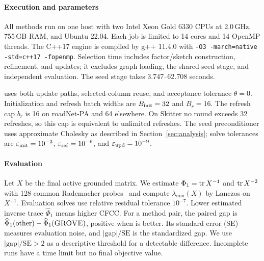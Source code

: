 \paragraph{Execution and parameters}
All methods run on one host with two Intel Xeon Gold 6330 CPUs at
2.0\,GHz, 755\,GB RAM, and Ubuntu 22.04. Each job is limited to
14 cores and 14 OpenMP threads. The C++17 engine is compiled by
g++ 11.4.0 with \texttt{-O3 -march=native -std=c++17 -fopenmp}.
Selection time includes factor/sketch construction, refinement, and
updates; it excludes graph loading, the shared seed stage, and
independent evaluation. The seed stage takes 3.747--62.708 seconds.

\alg{} uses both update paths, selected-column reuse, and acceptance tolerance $\theta=0$. Initialization and refresh
batch widths are $B_{\rm init}=32$ and $B_r=16$. The refresh cap $b_r$
is 16 on roadNet-PA and 64 elsewhere. On Skitter no round exceeds
32 refreshes, so this cap is equivalent to unlimited refreshes.
The seed preconditioner uses approximate Cholesky as described in
Section~\ref{sec:analysis}; solve tolerances are
$\varepsilon_{\rm init}=10^{-3}$, $\varepsilon_{\rm ref}=10^{-6}$, and $\varepsilon_{\rm upd}=10^{-9}$.

\paragraph{Evaluation}
Let $X$ be the final active grounded matrix. We estimate
$\Phi_1=\operatorname{tr} X^{-1}$ and $\operatorname{tr} X^{-2}$ with 128 common
Rademacher probes~\cite{hutchinson1990} and compute
$\lambda_{\min}(X)$ by Lanczos on
$X^{-1}$. Evaluation solves use relative residual tolerance
$10^{-7}$. Lower estimated inverse trace $\widehat\Phi_1$ means
higher CFCC. For a method pair, the paired gap is
$\widehat\Phi_1(\text{other})-\widehat\Phi_1(\textsc{GROVE}{})$, positive
when \alg{} is better. Its standard error (SE) measures evaluation
noise, and $|\text{gap}|/\mathrm{SE}$ is the standardized gap. We use
$|\text{gap}|/\mathrm{SE}>2$ as a
descriptive threshold for a detectable difference. Incomplete runs
have a time limit but no final objective value.

